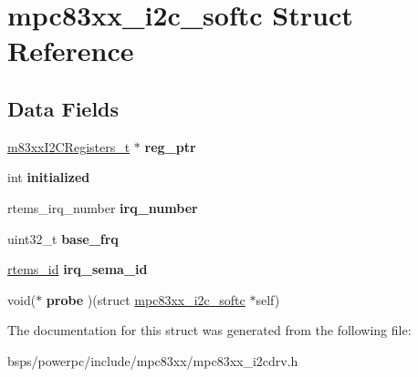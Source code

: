 \hypertarget{structmpc83xx__i2c__softc}{}\section{mpc83xx\+\_\+i2c\+\_\+softc Struct Reference}
\label{structmpc83xx__i2c__softc}
\subsection*{Data Fields}
\begin{DoxyCompactItemize}
\item 
\mbox{\label{structmpc83xx__i2c__softc_a9c6c5a682e5c65a4225a6f1d43c74de3}} 
\mbox{\hyperlink{structm83xxI2CRegisters__}{m83xx\+I2\+C\+Registers\+\_\+t}} $\ast$ {\bfseries reg\+\_\+ptr}
\item 
\mbox{\label{structmpc83xx__i2c__softc_aadba37cdb06354ba55513819234e8904}} 
int {\bfseries initialized}
\item 
\mbox{\label{structmpc83xx__i2c__softc_a8323410f30f99a5cb132d82881d67a6f}} 
rtems\+\_\+irq\+\_\+number {\bfseries irq\+\_\+number}
\item 
\mbox{\label{structmpc83xx__i2c__softc_a219c51d10486c20912634882872b12aa}} 
uint32\+\_\+t {\bfseries base\+\_\+frq}
\item 
\mbox{\label{structmpc83xx__i2c__softc_a59e99fae99d21ae406e28b32fcb6e26d}} 
\mbox{\hyperlink{group__ClassicTasks_gab20892b814dced7dd4e5b9bf42becd57}{rtems\+\_\+id}} {\bfseries irq\+\_\+sema\+\_\+id}
\item 
\mbox{\label{structmpc83xx__i2c__softc_abb15eabe98536102db91b5ffc824136e}} 
void($\ast$ {\bfseries probe} )(struct \mbox{\hyperlink{structmpc83xx__i2c__softc}{mpc83xx\+\_\+i2c\+\_\+softc}} $\ast$self)
\end{DoxyCompactItemize}


The documentation for this struct was generated from the following file\+:\begin{DoxyCompactItemize}
\item 
bsps/powerpc/include/mpc83xx/mpc83xx\+\_\+i2cdrv.\+h\end{DoxyCompactItemize}
